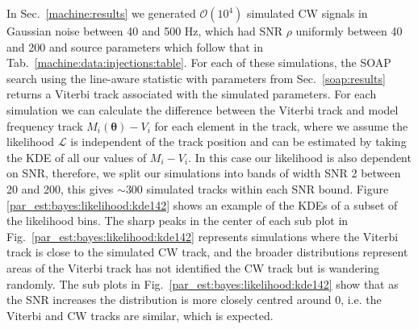 In Sec.~\ref{machine:results} we generated $\mathcal{O}(10^{4})$ simulated \gls{CW} signals in Gaussian noise between 40 and 500 Hz, which had \gls{SNR} $\rho$ uniformly between 40 and 200 and source parameters which follow that in Tab.~\ref{machine:data:injections:table}. For each of these simulations, the SOAP search using the line-aware statistic with parameters from Sec.~\ref{soap:results} returns a Viterbi track associated with the simulated parameters.
For each simulation we can calculate the difference between the Viterbi track and model frequency track $M_i(\bm{\theta}) - V_i$ for each element in the track, where we assume the likelihood $\mathcal{L}$ is independent of the track position and can be estimated by taking the \gls{KDE} of all our values of $M_i - V_i$.
In this case our likelihood is also dependent on \gls{SNR}, therefore, we split our simulations into bands of width \gls{SNR} 2 between 20 and 200, this gives $\sim 300$ simulated tracks within each \gls{SNR} bound.
Figure \ref{par_est:bayes:likelihood:kde142} shows an example of the \glspl{KDE} of a subset of the likelihood bins. 
The sharp peaks in the center of each sub plot in Fig.~\ref{par_est:bayes:likelihood:kde142} represents simulations where the Viterbi track is close to the simulated \gls{CW} track, and the broader distributions represent areas of the Viterbi track has not identified the \gls{CW} track but is wandering randomly.
The sub plots in Fig.~\ref{par_est:bayes:likelihood:kde142} show that as the \gls{SNR} increases the distribution is more closely centred around 0, i.e. the Viterbi and \gls{CW} tracks are similar, which is expected.
%
